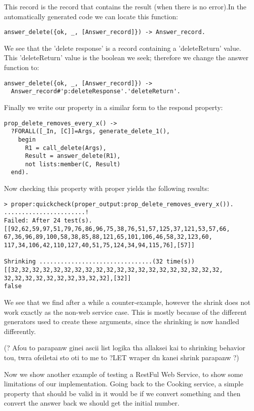 \documentclass[submission,copyright,a4]{eptcs}
\begin{document}
This record is the record that contains the result (when there is no error).In the automatically generated code we can locate this function:

\begin{lstlisting}
answer_delete({ok, _, [Answer_record]}) -> Answer_record.
\end{lstlisting}

We see that the 'delete response' is a record containing a 'deleteReturn' value. This 'deleteReturn' value is the boolean we seek; therefore we change the answer function to:

\begin{lstlisting}
answer_delete({ok, _, [Answer_record]}) ->
  Answer_record#'p:deleteResponse'.'deleteReturn'.
\end{lstlisting}

Finally we write our property in a similar form to the respond property:

\begin{lstlisting}
prop_delete_removes_every_x() ->
  ?FORALL([_In, [C]]=Args, generate_delete_1(),
    begin
      R1 = call_delete(Args),
      Result = answer_delete(R1),
      not lists:member(C, Result)
  end).
\end{lstlisting}

Now checking this property with proper yields the following results:
\begin{lstlisting}
> proper:quickcheck(proper_output:prop_delete_removes_every_x()).
.......................!
Failed: After 24 test(s).
[[92,62,59,97,51,79,76,86,96,75,38,76,51,57,125,37,121,53,57,66,
67,36,96,89,100,58,38,85,88,121,65,101,106,46,58,32,123,60,
117,34,106,42,110,127,40,51,75,124,34,94,115,76],[57]]

Shrinking ................................(32 time(s))
[[32,32,32,32,32,32,32,32,32,32,32,32,32,32,32,32,32,32,32,32,
32,32,32,32,32,32,32,33,32,32],[32]]
false
\end{lstlisting}

We see that we find after a while a counter-example, however the shrink does not work exactly as the non-web service case. This is mostly because of the different generators used to create these arguments, since the shrinking is now handled differently.

(? Afou to parapanw ginei ascii list logika tha allaksei kai to shrinking behavior tou, twra ofeiletai sto oti to me to ?LET wraper dn kanei shrink parapanw ?)

Now we show another example of testing a RestFul Web Service, to show some limitations of our implementation. Going back to the Cooking service, a simple property that should be valid in it would be if we convert something and then convert the answer back we should get the initial number.
\end{document}
